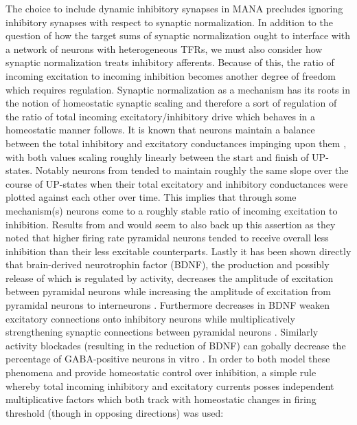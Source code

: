 \documentclass[10pt,letterpaper]{article}
\begin{document}
The choice to include dynamic inhibitory synapses in MANA precludes ignoring inhibitory synapses with respect to synaptic normalization. In addition to the question of how the target sums of synaptic normalization ought to interface with a network of neurons with heterogeneous TFRs, we must also consider how synaptic normalization treats inhibitory afferents. Because of this, the ratio of incoming excitation to incoming inhibition becomes another degree of freedom which requires regulation. Synaptic normalization as a mechanism has its roots in the notion of homeostatic synaptic scaling \cite{lazar2009sorn} and therefore a sort of regulation of the ratio of total incoming excitatory/inhibitory drive which behaves in a homeostatic manner follows.  It is known that neurons maintain a balance between the total inhibitory and excitatory conductances impinging upon them \cite{haider2006neocortical} , with both values scaling roughly linearly between the start and finish of UP-states. Notably neurons from \cite{haider2006neocortical} tended to maintain roughly the same slope over the course of UP-states when their total  excitatory and inhibitory conductances were plotted against each other over time. This implies that through some mechanism(s) neurons come to a roughly stable ratio of incoming excitation to inhibition. Results from \cite{benedetti2012differential} and \cite{yassin2010embedded} would seem to also back up this assertion as they noted that higher firing rate pyramidal neurons tended to receive overall less inhibition than their less excitable counterparts. Lastly it has been shown directly that brain-derived neurotrophin factor (BDNF), the production and possibly release of which is regulated by activity, decreases the amplitude of excitation between pyramidal neurons while increasing the amplitude of excitation from pyramidal neurons to interneurons \cite{rutherford1998bdnf}\cite{turrigiano1999homeostatic}\cite{turrigiano2004homeostatic}. Furthermore decreases in BDNF weaken excitatory connections onto inhibitory neurons while multiplicatively strengthening synaptic connections between pyramidal neurons \cite{rutherford1997brain}. Similarly activity blockades (resulting in the reduction of BDNF) can gobally decrease the percentage of GABA-positive neurons in vitro \cite{rutherford1997brain}. In order to both model these phenomena and provide homeostatic control over inhibition, a simple rule whereby total incoming inhibitory and excitatory currents posses independent multiplicative factors which both track with homeostatic changes in firing threshold (though in opposing directions) was used:
\end{document}
